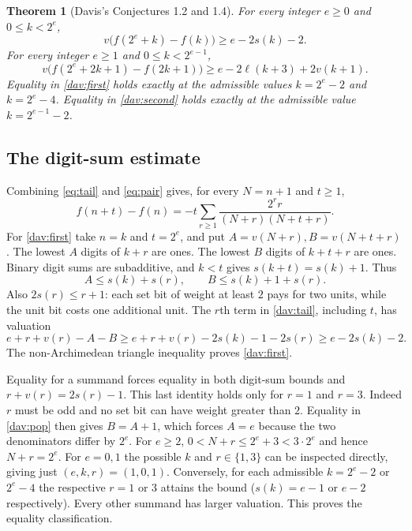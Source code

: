 \documentclass[11pt]{article}
\newtheorem{theorem}{Theorem}[section]
\begin{document}
\begin{theorem}[Davis's Conjectures 1.2 and 1.4]\label{dav:main}
For every integer $e\ge0$ and $0\le k<2^e$,
\begin{equation}\label{dav:first}
 v\bigl(f(2^e+k)-f(k)\bigr)\ge e-2s(k)-2.
\end{equation}
For every integer $e\ge1$ and $0\le k<2^{e-1}$,
\begin{equation}\label{dav:second}
 v\bigl(f(2^e+2k+1)-f(2k+1)\bigr)
                 \ge e-2\ell(k+3)+2v(k+1).
\end{equation}
Equality in \eqref{dav:first} holds exactly at the admissible values
$k=2^e-2$ and $k=2^e-4$. Equality in \eqref{dav:second} holds exactly at the admissible value $k=2^{e-1}-2$.
\end{theorem}

\subsection{The digit-sum estimate}
Combining \eqref{eq:tail} and \eqref{eq:pair} gives, for every $N=n+1$ and $t\ge1$,
\begin{equation}\label{dav:tail}
 f(n+t)-f(n)=-t\sum_{r\ge1}\frac{2^r r}{(N+r)(N+t+r)} .
\end{equation}
For \eqref{dav:first} take $n=k$ and $t=2^e$, and put
$A=v(N+r), B=v(N+t+r)$. The lowest $A$ digits of $k+r$
are ones. The lowest $B$ digits of $k+t+r$ are ones.
Binary digit sums are subadditive, and $k<t$ gives $s(k+t)=s(k)+1$.
Thus
\begin{equation}\label{dav:pop}
 A\le s(k)+s(r),\qquad B\le s(k)+1+s(r).
\end{equation}
Also $2s(r)\le r+1$: each set bit of weight at least $2$ pays for
two units, while the unit bit costs one additional unit. The $r$th
term in \eqref{dav:tail}, including $t$, has valuation
\[
 e+r+v(r)-A-B\ge e+r+v(r)-2s(k)-1-2s(r)\ge e-2s(k)-2.
\]
The non-Archimedean triangle inequality proves \eqref{dav:first}.

Equality for a summand forces equality in both digit-sum bounds and
$r+v(r)=2s(r)-1$. This last identity holds only for $r=1$ and $r=3$. Indeed $r$ must be odd and no set bit can have weight greater than $2$.
Equality in \eqref{dav:pop} then gives $B=A+1$, which forces $A=e$
because the two denominators differ by $2^e$. For $e\ge2$,
$0<N+r\le2^e+3<3\cdot2^e$ and hence $N+r=2^e$. For $e=0,1$
the possible $k$ and $r\in\{1,3\}$ can be inspected directly,
giving just $(e,k,r)=(1,0,1)$. Conversely, for each admissible
$k=2^e-2$ or $2^e-4$ the respective $r=1$ or $3$ attains the
bound ($s(k)=e-1$ or $e-2$ respectively). Every other summand
has larger valuation. This proves the equality classification.
\end{document}
